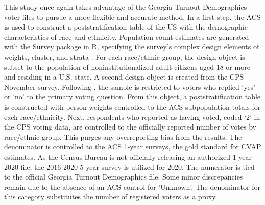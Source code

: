\begin{table}[H]
\begin{threeparttable}
\end{threeparttable}
\end{table}



This study once again takes advantage of the Georgia Turnout Demographics voter files to pursue a more flexible and accurate method. In a first step, the ACS is used to construct a poststratification table of the US with the demographic characteristics of race and ethnicity. Population count estimates are generated with the Survey package in R, specifying the survey's complex design elements of weights, cluster, and strata \citep{lumley_survey_2020}. For each race/ethnic group, the design object is subset to the population of noninstitutionalized adult citizens aged 18 or more and residing in a U.S. state. A second design object is created from the CPS November survey. Following \citet{hur_coding_2013}, the sample is restricted to voters who replied `yes' or `no' to the primary voting question. From this object, a poststratification table is constructed with person weights controlled to the ACS subpopulation totals for each race/ethnicity. Next, respondents who reported as having voted, coded `2' in the CPS voting data, are controlled to the officially reported number of votes by race/ethnic group. This purges any overreporting bias from the results. The denominator is controlled to the ACS 1-year surveys, the gold standard for CVAP estimates. As the Census Bureau is not officially releasing an authorized 1-year 2020 file, the 2016-2020 5-year survey is utilized for 2020. The numerator is tied to the official Georgia Turnout Demographics file. Some minor discrepancies remain due to the absence of an ACS control for 'Unknown'. The denominator for this category substitutes the number of registered voters as a proxy. 



